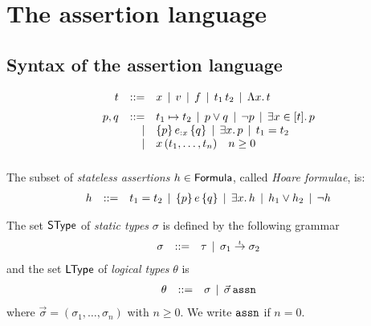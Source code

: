 \documentclass[12pt,a4paper]{report}
\begin{document}

\chapter{The assertion language}



\section{Syntax of the assertion language}

\[\GRbeg
  t \GRis x \GRmid v \GRmid f \GRmid \app{t_1}{t_2} \GRmid \tabstr{x}{t}
    \GRnl

  p,q \GRis t_1 \mapsto t_2 \GRmid p \vee q \GRmid \neg p \GRmid \qbex{x}{t}{p}
      \GRal \triple{p}{e_{:x}}{q} \GRmid \qex{x}{p} \GRmid t_1 = t_2
      \GRal x\,(t_1,\ldots,t_n) \quad n \ge 0
      \GRnl
\GRend\]

The subset of {\em stateless assertions} $h \in \mathsf{Formula}$, called {\em Hoare formulae}, is:
\[\begin{array}{rrlll}
  h & ::= & t_1 = t_2 \,\mid\, \{p\}\,e\,\{q\} \,\mid\, \exists{x}.\,{h} \,\mid\, h_1 \vee h_2 \,\mid\, \neg h
\end{array}\]

%
%
%
%

The set $\mathsf{SType}$ of {\em static types} $\sigma$ is defined by the following grammar
\[\begin{array}{rrlll}
  \sigma & ::= & \tau \,\mid\, \sigma_1\stackrel{_t}{\to}\sigma_2
\end{array}\]
and the set $\mathsf{LType}$ of {\em logical types} $\theta$ is
\[\begin{array}{rrlll}
  \theta & ::= & \sigma \,\mid\, \vec{\sigma}\,\mathtt{assn}
\end{array}\]
where $\vec{\sigma} = (\sigma_1,\ldots,\sigma_n)$ with $n \ge 0$. We write
$\mathtt{assn}$ if $n = 0$.
\end{document}
